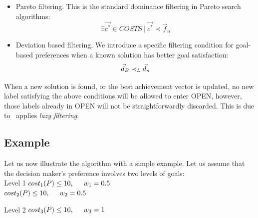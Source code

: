 \begin{itemize}
   \item Pareto filtering. This is the standard dominance filtering in Pareto search algorithms:
     \begin{equation}\label{eq:cond-filter-dom}
     \exists \vec{c^*} \in COSTS \ | \ \vec{c^*} \prec \vec{f}_n
     \end{equation}

   \item Deviation based filtering. We introduce a specific filtering condition for goal-based preferences when a known solution has better goal satisfaction:
     \begin{equation}\label{eq:cond-filter-new}
     \vec{d}_B \prec_{L} \vec{d}_n
     \end{equation}
\end{itemize}

When a new solution is found, or the best achievement vector is updated, no new label satisfying the above conditions will be allowed to enter OPEN, however, those labels already in OPEN will not be straightforwardly discarded. This is due to \lexgo \ applies \emph{lazy filtering}. 

\subsection{Example}
\label{chapMultiObjAlg:subsubsec:example}

Let us now illustrate the algorithm with a simple example. Let us assume that the decision maker's preference involves two levels of goals: \\
 
Level 1 \hspace{10 mm} $cost_{1}(P) \leq 10, \hspace{5 mm} w_{1} = 0.5$ \\
\hphantom{a} \hspace{26 mm} $cost_{2}(P) \leq 10, \hspace{5 mm} w_{2} = 0.5$ 

Level 2 \hspace{10 mm} $cost_{3}(P) \leq 10, \hspace{5 mm} w_{3} = 1$ \\

